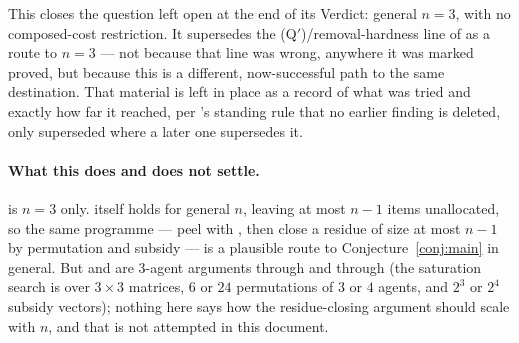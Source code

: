 This closes the question  left open at the end of its
Verdict: general $n=3$, with no composed-cost restriction. It supersedes the
(Q$'$)/removal-hardness line of  as a route to
$n=3$ --- not because that line was wrong, anywhere it was marked proved, but
because this is a different, now-successful path to the same destination.
That material is left in place as a record of what was tried and exactly how
far it reached, per 's standing rule that no earlier
finding is deleted, only superseded where a later one supersedes it.

\paragraph{What this does and does not settle.}  is
$n=3$ only.  itself holds for general $n$, leaving at most
$n-1$ items unallocated, so the same programme --- peel with
, then close a residue of size at most $n-1$ by permutation
and subsidy --- is a plausible route to Conjecture~\ref{conj:main} in
general. But  and  are $3$-agent
arguments through and through (the saturation search is over $3\times3$
matrices, $6$ or $24$ permutations of $3$ or $4$ agents, and $2^3$ or $2^4$
subsidy vectors); nothing here says how the residue-closing argument should
scale with $n$, and that is not attempted in this document.
